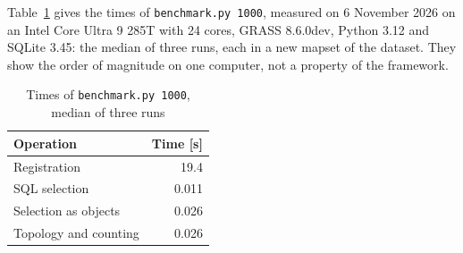 \documentclass[10pt,a4paper]{article}
\newcommand{\code}[1]{\texttt{#1}}
\begin{document}
Table~\ref{tab:benchmark} gives the times of \code{benchmark.py 1000},
measured on 6 November 2026 on an Intel Core Ultra 9 285T with 24 cores,
GRASS 8.6.0dev, Python 3.12 and SQLite 3.45: the median of three runs, each in
a new mapset of the dataset. They show the order of magnitude on one computer,
not a property of the framework.

\begin{table}[ht]
\centering
\caption{Times of \code{benchmark.py 1000}, median of three runs}
\label{tab:benchmark}
\begin{tabular}{lr}
\toprule
Operation & Time [s] \\
\midrule
Registration & 19.4 \\
SQL selection & 0.011 \\
Selection as objects & 0.026 \\
Topology and counting & 0.026 \\
\bottomrule
\end{tabular}
\end{table}



\end{document}
